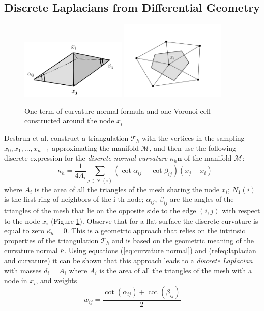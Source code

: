 \subsection{Discrete Laplacians from Differential Geometry}
\begin{figure}[h]
	\begin{center}
		\includegraphics[width=0.45\textwidth]{figs/Chapter3/MyDesbrun.png}
		\includegraphics[width=0.45\textwidth]{figs/Chapter3/Voronoi}
	\end{center}
	\caption{\label{fig:Desbrun}One term of curvature normal formula and one Voronoi cell constructed around the node $x_i$}
\end{figure} 
Desbrun et al. \cite{Desbrun1999} construct a triangulation $\mathcal T_h$ with the vertices in the sampling $x_0, x_1, ..., x_{n-1}$ approximating the manifold $\mathcal M$, and then use the following discrete expression for the \textit{discrete normal curvature} $\overline{\kappa_h} \mathbf{n}$ of the manifold $\mathcal M$:
\begin{equation}\label{eq:curvature normal}
	-\overline{\kappa_h} =\frac{1}{4 A_i} \sum_{j \in N_{1}(i)}\left(\cot \alpha_{ij}+\cot \beta_{ij}\right)\left(x_{j}-x_{i}\right)
\end{equation}
where $A_i$ is the area of all the triangles of the mesh sharing the node $x_i$; $N_1(i)$ is the first ring of neighbors of the i-th node; $\alpha_{i j},\ \beta_{i j}$ are the angles of the triangles of the mesh that lie on the opposite side to the edge $(i,j)$ with respect to the node $x_i$ (Figure \ref{fig:Desbrun}). Observe that for a flat surface the discrete curvature is equal to zero $\overline{\kappa_h}=0$. This is a geometric approach that relies on the intrinsic properties of the triangulation $\mathcal T_h$ and is based on the geometric meaning of the curvature normal $\overline{\kappa}$. Using equations (\ref{eq:curvature normal}) and (ref{eq:laplacian and curvature}) it can be shown \cite{REUTER2009381} that this approach leads to a \textit{discrete Laplacian} with masses $d_i=A_i$ where $A_i$ is the area of all the triangles of the mesh with a node in $x_i$, and weights
$$
w_{i j}=\frac{\cot \left(\alpha_{i j}\right)+\cot \left(\beta_{i j}\right)}{2}
$$

